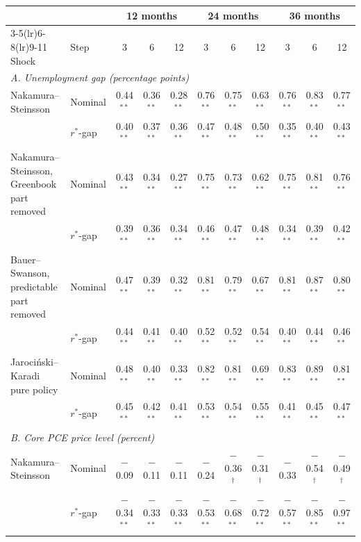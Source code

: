 \begin{tabular}{llccccccccc}
\toprule
 & & \multicolumn{3}{c}{12 months} & \multicolumn{3}{c}{24 months} & \multicolumn{3}{c}{36 months}\\
\cmidrule(lr){3-5}\cmidrule(lr){6-8}\cmidrule(lr){9-11}
Shock & Step & 3 & 6 & 12 & 3 & 6 & 12 & 3 & 6 & 12 \\
\midrule
\multicolumn{11}{l}{\textit{A. Unemployment gap (percentage points)}}\\
Nakamura--Steinsson & Nominal & 0.44$^{**}$ & 0.36$^{**}$ & 0.28$^{**}$ & 0.76$^{**}$ & 0.75$^{**}$ & 0.63$^{**}$ & 0.76$^{**}$ & 0.83$^{**}$ & 0.77$^{**}$ \\
 & $r^*$-gap & 0.40$^{**}$ & 0.37$^{**}$ & 0.36$^{**}$ & 0.47$^{**}$ & 0.48$^{**}$ & 0.50$^{**}$ & 0.35$^{**}$ & 0.40$^{**}$ & 0.43$^{**}$ \\
Nakamura--Steinsson, Greenbook part removed & Nominal & 0.43$^{**}$ & 0.34$^{**}$ & 0.27$^{**}$ & 0.75$^{**}$ & 0.73$^{**}$ & 0.62$^{**}$ & 0.75$^{**}$ & 0.81$^{**}$ & 0.76$^{**}$ \\
 & $r^*$-gap & 0.39$^{**}$ & 0.36$^{**}$ & 0.34$^{**}$ & 0.46$^{**}$ & 0.47$^{**}$ & 0.48$^{**}$ & 0.34$^{**}$ & 0.39$^{**}$ & 0.42$^{**}$ \\
Bauer--Swanson, predictable part removed & Nominal & 0.47$^{**}$ & 0.39$^{**}$ & 0.32$^{**}$ & 0.81$^{**}$ & 0.79$^{**}$ & 0.67$^{**}$ & 0.81$^{**}$ & 0.87$^{**}$ & 0.80$^{**}$ \\
 & $r^*$-gap & 0.44$^{**}$ & 0.41$^{**}$ & 0.40$^{**}$ & 0.52$^{**}$ & 0.52$^{**}$ & 0.54$^{**}$ & 0.40$^{**}$ & 0.44$^{**}$ & 0.46$^{**}$ \\
Jaroci\'nski--Karadi pure policy & Nominal & 0.48$^{**}$ & 0.40$^{**}$ & 0.33$^{**}$ & 0.82$^{**}$ & 0.81$^{**}$ & 0.69$^{**}$ & 0.83$^{**}$ & 0.89$^{**}$ & 0.81$^{**}$ \\
 & $r^*$-gap & 0.45$^{**}$ & 0.42$^{**}$ & 0.41$^{**}$ & 0.53$^{**}$ & 0.54$^{**}$ & 0.55$^{**}$ & 0.41$^{**}$ & 0.45$^{**}$ & 0.47$^{**}$ \\
\midrule
\multicolumn{11}{l}{\textit{B. Core PCE price level (percent)}}\\
Nakamura--Steinsson & Nominal & $-$0.09 & $-$0.11 & $-$0.11 & $-$0.24 & $-$0.36$^{\dagger}$ & $-$0.31$^{\dagger}$ & $-$0.33 & $-$0.54$^{\dagger}$ & $-$0.49$^{\dagger}$ \\
 & $r^*$-gap & $-$0.34$^{**}$ & $-$0.33$^{**}$ & $-$0.33$^{**}$ & $-$0.53$^{**}$ & $-$0.68$^{**}$ & $-$0.72$^{**}$ & $-$0.57$^{**}$ & $-$0.85$^{**}$ & $-$0.97$^{**}$ \\

\end{tabular}
